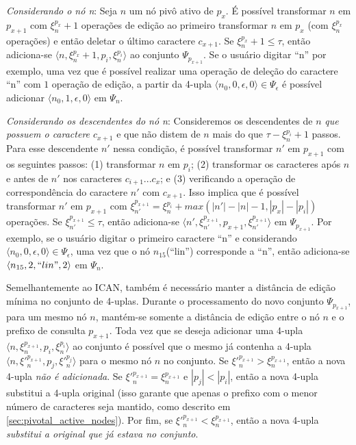 \textit{Considerando o nó n}: Seja $n$ um nó pivô ativo de $p_{x}$. É possível transformar $n$ em $p_{x+1}$ com $\xi_{n}^{p_{x}} + 1$ operações de edição ao primeiro transformar $n$ em $p_{x}$ (com $\xi_{n}^{p_{x}}$ operações) e então deletar o último caractere $c_{x+1}$. Se $\xi_{n}^{p_{x}} + 1 \leq \tau$, então adiciona-se $\langle n, \xi_{n}^{p_{x}} + 1, p_{i}, \xi_{n}^{p_{i}} \rangle$ ao conjunto $\Psi_{p_{x+1}}$. Se o usuário digitar ``n'' por exemplo, uma vez que é possível realizar uma operação de deleção do caractere ``n'' com $1$ operação de edição, a partir da 4-upla $\langle n_{0}, 0, \epsilon, 0 \rangle \in \Psi_{\epsilon}$ é possível adicionar $\langle n_{0}, 1, \epsilon, 0 \rangle$ em $\Psi_{n}$.

\textit{Considerando os descendentes do nó n}: Consideremos os descendentes de $n$ \textit{que possuem o caractere $c_{x+1}$} e que não distem de $n$ mais do que $\tau - \xi_{n}^{p_{i}} + 1$ passos. Para esse descendente $n'$ nessa condição, é possível transformar $n'$ em $p_{x+1}$ com os seguintes passos: (1) transformar $n$ em $p_{i}$; (2) transformar os caracteres após $n$ e antes de $n'$ nos caracteres $c_{i+1}...c_{x}$; e (3) verificando a operação de correspondência do caractere $n'$ com $c_{x+1}$. Isso implica que é possível transformar $n'$ em $p_{x+1}$ com $\xi_{n'}^{p_{x+1}} = \xi_{n}^{p_{i}} + max(|n'| - |n| - 1, |p_{x}| - |p_{i}|)$ operações. Se $\xi_{n'}^{p_{x+1}} \leq \tau$, então adiciona-se $\langle n', \xi_{n'}^{p_{x+1}}, p_{x+1}, \xi_{n'}^{p_{x+1}} \rangle$ em $\Psi_{p_{x+1}}$. Por exemplo, se o usuário digitar o primeiro caractere ``n'' e considerando $\langle n_{0}, 0, \epsilon, 0 \rangle \in \Psi_{\epsilon}$, uma vez que o nó $n_{15}$(``lin'') corresponde a ``n'', então adiciona-se $\langle n_{15}, 2, ``lin", 2 \rangle$ em $\Psi_{n}$.

Semelhantemente ao ICAN, também é necessário manter a distância de edição mínima no conjunto de 4-uplas. Durante o processamento do novo conjunto $\Psi_{p_{x+1}}$, para um mesmo nó $n$, mantém-se somente a distância de edição entre o nó $n$ e o prefixo de consulta $p_{x+1}$. Toda vez que se deseja adicionar uma 4-upla $\langle n, \xi_{n}^{p_{x + 1}}, p_{i}, \xi_{n}^{p_{i}} \rangle$ ao conjunto é possível que o mesmo já contenha a 4-upla $\langle n, {\xi'}_{n}^{p_{x + 1}}, p_{j}, {\xi'}_{n}^{p_{j}} \rangle$ para o mesmo nó $n$ no conjunto. Se ${\xi'}_{n}^{p_{x+1}} > \xi_{n}^{p_{x+1}}$, então a nova 4-upla \textit{não é adicionada}. Se ${\xi'}_{n}^{p_{x+1}} = \xi_{n}^{p_{x+1}}$ e $|p_{j}| < |p_{i}|$, então a nova 4-upla substitui a 4-upla original (isso garante que apenas o prefixo com o menor número de caracteres seja mantido, como descrito em \ref{sec:pivotal_active_nodes}). Por fim, se ${\xi'}_{n}^{p_{x+1}} < \xi_{n}^{p_{x+1}}$, então a nova 4-upla \textit{substitui a original que já estava no conjunto}.

